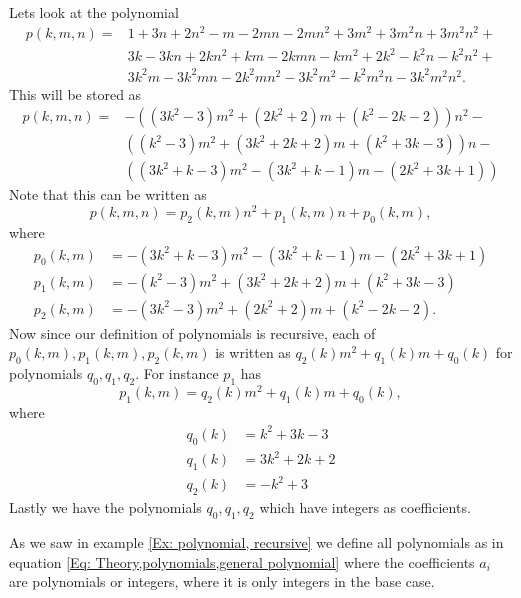 \begin{example}\label{Ex: polynomial, recursive}
  Lets look at the polynomial
  \begin{equation*}
    \begin{split}
      p(k,m,n) = &1+3n+2n^2-m-2mn-2mn^2+3m^2+3m^2n+3m^2n^2+\\
      &3k-3kn+2kn^2+km-2kmn-km^2+2k^2-k^2n-k^2n^2+\\
      &3k^2m-3k^2mn-2k^2mn^2-3k^2m^2-k^2m^2n-3k^2m^2n^2.
    \end{split}
  \end{equation*}
  This will be stored as
  \begin{equation*}
    \begin{split}
      p(k,m,n) =  &-((3k^2-3)m^2+(2k^2+2)m+(k^2-2k-2))n^2-\\
                  &((k^2-3)m^2+(3k^2+2k+2)m+(k^2+3k-3))n-\\
                  &((3k^2+k-3)m^2-(3k^2+k-1)m-(2k^2+3k+1))
    \end{split}
  \end{equation*}
  Note that this can be written as
  \begin{equation*}
    p(k,m,n) = p_2(k,m)n^2+p_1(k,m)n+p_0(k,m),
  \end{equation*}
  where
  \begin{equation*}
    \begin{split}
      p_0(k,m) &= -(3k^2+k-3)m^2-(3k^2+k-1)m-(2k^2+3k+1)\\
      p_1(k,m) &= -(k^2-3)m^2+(3k^2+2k+2)m+(k^2+3k-3)\\
      p_2(k,m) &= -(3k^2-3)m^2+(2k^2+2)m+(k^2-2k-2).
    \end{split}
  \end{equation*}
  Now since our definition of polynomials is recursive, each of $p_0(k,m),p_1(k,m),p_2(k,m)$ is written as $q_2(k)m^2+q_1(k)m+q_0(k)$ for polynomials $q_0,q_1,q_2$. For instance $p_1$ has
  \begin{equation*}
    p_1(k,m) = q_2(k)m^2+q_1(k)m+q_0(k),
  \end{equation*}
  where
  \begin{equation*}
    \begin{split}
      q_0(k) & = k^2+3k-3 \\
      q_1(k) & = 3k^2+2k+2 \\
      q_2(k) & = -k^2+3
    \end{split}
  \end{equation*}
  Lastly we have the polynomials $q_0,q_1,q_2$ which have integers as coefficients.
\end{example}
As we saw in example \ref{Ex: polynomial, recursive} we define all polynomials as in equation \ref{Eq: Theory,polynomials,general polynomial} where the coefficients $a_i$ are polynomials or integers, where it is only integers in the base case.

